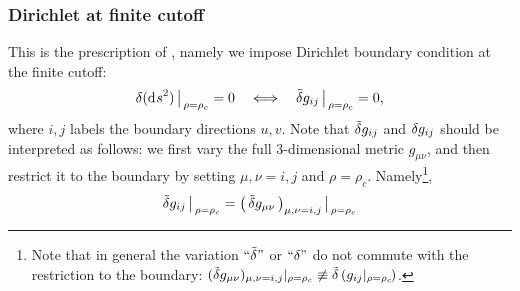 \documentclass[12pt,a4paper,utf8]{article}
\newcommand{\tvar}[1]{\mathinner{\tilde{\delta} #1}}
\begin{document}
\subsubsection{Dirichlet at finite cutoff}
\label{subsubsect:dirichlet}
	This is the prescription of \cite{Guica:2019nzm,Kraus:2021cwf}, namely we impose Dirichlet boundary condition at the finite cutoff:
	\begin{equation}
		\var{(\dd{s}^2)}\big|_{\,\rho = \rho_c}
		= 0
	\quad\Longleftrightarrow\quad
		\tvar{g_{ij}}\big|_{\,\rho = \rho_c} = 0,
	\end{equation}
	where $i,j$ labels the boundary directions $u,v$. Note that $\tvar{g_{ij}}$ and $\mathinner{\delta g_{ij}}$ should be interpreted as follows: we first vary the full 3-dimensional metric $g_{\mu\nu}$, and then restrict it to the boundary by setting $\mu,\nu = i,j$ and $\rho = \rho_c$. Namely\footnote{
		Note that in general the variation $\text{``$\tilde{\delta}$''}$ or $\text{``$\delta$''}$ do not commute with the restriction to the boundary: $
			( \tvar{g_{\mu\nu}} )
				_{\mu,\nu = i,j}
				|_{\rho = \rho_c}
			\not\equiv
			\tilde{\delta}\,(
				g_{ij}
				|_{\rho = \rho_c\!}
			)
		$. 
	}, 
	\begin{equation}
		\tvar{g_{ij}}\big|_{\,\rho = \rho_c}
		= \big( \tvar{g_{\mu\nu}} \big)
			_{\mu,\nu = i,j\,}
			\big|_{\,\rho = \rho_c}
	\end{equation}
	
\end{document}
